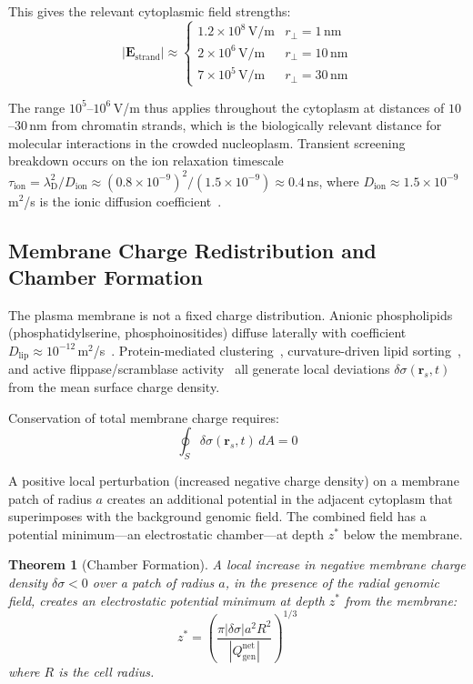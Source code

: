\documentclass[12pt,a4paper]{article}
\newtheorem{theorem}{Theorem}[section]
\theoremstyle{definition}
\theoremstyle{remark}
\newcommand{\lD}{\lambda_{\mathrm{D}}}
\newcommand{\Qgen}{Q_{\mathrm{gen}}}
\newcommand{\vv}[1]{\boldsymbol{#1}}
\newcommand{\abs}[1]{\left|#1\right|}
\newcommand{\zstar}{z^{*}}
\begin{document}
This gives the relevant cytoplasmic field strengths:
\begin{equation}
  \abs{\vv{E}_{\mathrm{strand}}} \approx
  \begin{cases}
    1.2 \times 10^8\,\mathrm{V/m} & r_\perp = 1\,\mathrm{nm} \\
    2 \times 10^6\,\mathrm{V/m}   & r_\perp = 10\,\mathrm{nm} \\
    7 \times 10^5\,\mathrm{V/m}   & r_\perp = 30\,\mathrm{nm}
  \end{cases}
\end{equation}

The range $10^5$--$10^6$\,V/m thus applies throughout the cytoplasm at distances of $10$--$30$\,nm from chromatin strands, which is the biologically relevant distance for molecular interactions in the crowded nucleoplasm. Transient screening breakdown occurs on the ion relaxation timescale $\tau_{\mathrm{ion}} = \lD^2 / D_{\mathrm{ion}} \approx (0.8 \times 10^{-9})^2 / (1.5 \times 10^{-9}) \approx 0.4$\,ns, where $D_{\mathrm{ion}} \approx 1.5 \times 10^{-9}$\,m$^2$/s is the ionic diffusion coefficient~\cite{Hille2001}.

\subsection{Membrane Charge Redistribution and Chamber Formation}

The plasma membrane is not a fixed charge distribution. Anionic phospholipids (phosphatidylserine, phosphoinositides) diffuse laterally with coefficient $D_{\mathrm{lip}} \approx 10^{-12}$\,m$^2$/s~\cite{Saffman1975}. Protein-mediated clustering~\cite{McLaughlin2002}, curvature-driven lipid sorting~\cite{McMahon2005}, and active flippase/scramblase activity~\cite{Devaux1991} all generate local deviations $\delta\sigma(\vv{r}_s, t)$ from the mean surface charge density.

Conservation of total membrane charge requires:
\begin{equation}
  \oint_S \delta\sigma(\vv{r}_s, t)\,dA = 0
\end{equation}

A positive local perturbation (increased negative charge density) on a membrane patch of radius $a$ creates an additional potential in the adjacent cytoplasm that superimposes with the background genomic field. The combined field has a potential minimum---an electrostatic chamber---at depth $\zstar$ below the membrane.

\begin{theorem}[Chamber Formation]
\label{thm:chamber}
A local increase in negative membrane charge density $\delta\sigma < 0$ over a patch of radius $a$, in the presence of the radial genomic field, creates an electrostatic potential minimum at depth $\zstar$ from the membrane:
\begin{equation}
  \zstar = \left(\frac{\pi \abs{\delta\sigma} a^2 R^2}{\abs{\Qgen^{\mathrm{net}}}}\right)^{1/3}
  \label{eq:z_star}
\end{equation}
where $R$ is the cell radius.
\end{theorem}
\end{document}
